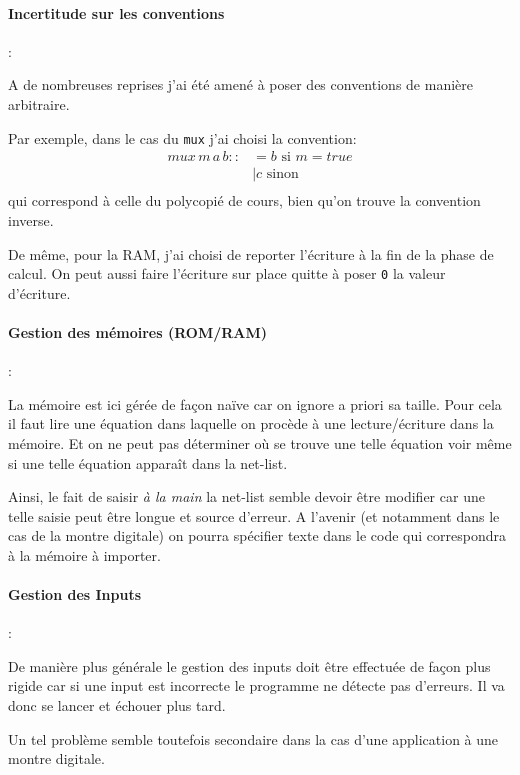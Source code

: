 \documentclass[11pt,a4paper]{article}
\newcommand{\si}{\text{ si }}
\newcommand{\sinon}{\text{ sinon }}
\begin{document}
\paragraph{Incertitude sur les conventions} :

A de nombreuses reprises j'ai été amené à poser des conventions de manière arbitraire.

Par exemple, dans le cas du \verb&mux& j'ai choisi la convention:
\begin{align*}
mux \, m \, a \, b ::&= b \si m= true \\
			& | c \sinon \\
\end{align*}
qui correspond à celle du polycopié de cours, bien qu'on trouve la convention inverse.

De même, pour la RAM, j'ai choisi de reporter l'écriture à la fin de la phase de calcul.
On peut aussi faire l'écriture sur place quitte à poser \verb&0& la valeur d'écriture.

\paragraph{Gestion des mémoires (ROM/RAM)} :

La mémoire est ici gérée de façon naïve car on ignore a priori sa taille. 
Pour cela il faut lire une équation dans laquelle on procède à une lecture/écriture dans la mémoire.
Et on ne peut pas déterminer où se trouve une telle équation voir même si une telle équation apparaît dans la net-list.

Ainsi, le fait de saisir \textit{à la main} la net-list semble devoir être modifier car une telle saisie peut être longue et source d'erreur.
A l'avenir (et notamment dans le cas de la montre digitale) on pourra spécifier texte dans le code qui correspondra à la mémoire à importer.

\paragraph{Gestion des Inputs} :

De manière plus générale le gestion des inputs doit être effectuée de façon plus rigide car si une input est incorrecte le programme ne détecte pas d'erreurs. 
Il va donc se lancer et échouer plus tard.

Un tel problème semble toutefois secondaire dans la cas d'une application à une montre digitale.
\end{document}
